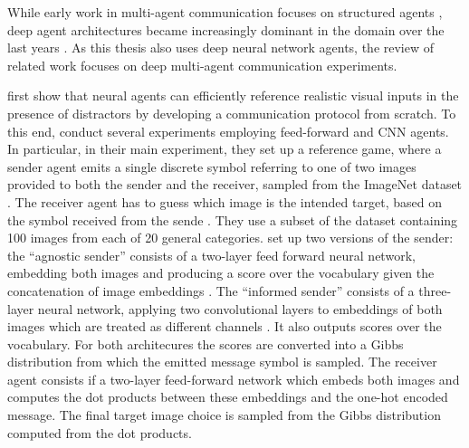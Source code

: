While early work in multi-agent communication focuses on structured agents \parencite[e. g., see][for reviews]{christiansen2003language, cangelosi2002symbol}, deep agent architectures became increasingly dominant in the domain over the last years \parencite{lazaridou2020emergent}. As this thesis also uses deep neural network agents, the review of related work focuses on deep multi-agent communication experiments. 


\cite{lazaridou2016multi} first show that neural agents can efficiently reference realistic visual inputs in the presence of distractors by developing a communication protocol from scratch. To this end, \textcite{lazaridou2016multi} conduct several experiments employing feed-forward and CNN agents. In particular, in their main experiment, they set up a reference game, where a sender agent emits a single discrete symbol referring to one of two images provided to both the sender and the receiver, sampled from the ImageNet dataset \parencite{deng2009imagenet}. The receiver agent has to guess  which image is the intended target, based on the symbol received from the sende . They use a subset of the dataset containing 100 images from each of 20 general categories. \cite{lazaridou2016multi} set up two versions of the sender: the ``agnostic sender'' consists of a two-layer feed forward neural network, embedding both images and producing a score over the vocabulary given the concatenation of image embeddings \parencite[][p. 3]{lazaridou2016multi}. The ``informed sender'' consists of a three-layer neural network, applying two convolutional layers to embeddings of both images which are treated as different channels \parencite[][p. 3]{lazaridou2016multi}. It also outputs scores over the vocabulary. For both architecures the scores are converted into a Gibbs distribution from which the emitted message symbol is sampled. The receiver agent consists if a two-layer feed-forward network which embeds both images and computes the dot products between these embeddings and the one-hot encoded message. The final target image choice is sampled from the Gibbs distribution computed from the dot products. %
